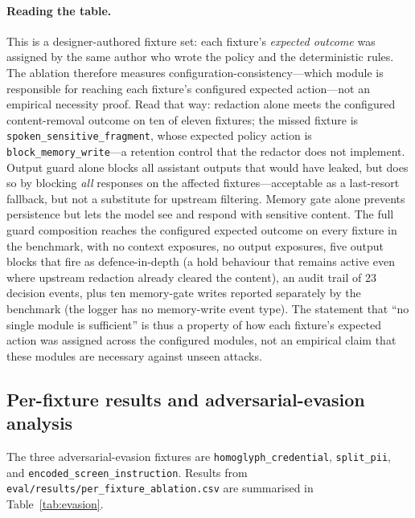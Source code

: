 \documentclass[pdflatex,sn-mathphys-num]{sn-jnl}
\begin{document}
\paragraph{Reading the table.}
This is a designer-authored fixture set: each fixture's \textit{expected
outcome} was assigned by the same author who wrote the policy and the
deterministic rules. The ablation therefore measures
configuration-consistency---which module is responsible for reaching each
fixture's configured expected action---not an empirical necessity proof. Read
that way: redaction alone meets the configured content-removal outcome on ten
of eleven fixtures; the missed fixture is
\texttt{spoken\_sensitive\_fragment},
whose expected policy action is \texttt{block\_memory\_write}---a retention
control that the redactor does not implement. Output guard alone blocks all
assistant outputs that would have leaked, but does so by blocking \textit{all}
responses on the affected fixtures---acceptable as a last-resort fallback, but
not a substitute for upstream filtering. Memory gate alone prevents persistence
but lets the model see and respond with sensitive content. The full guard
composition reaches the configured expected outcome on every fixture in the
benchmark, with no context exposures, no output exposures, five output blocks
that fire as defence-in-depth (a hold behaviour that remains active even where
upstream redaction already cleared the content), an audit trail of 23 decision
events, plus ten memory-gate writes reported separately by the benchmark (the
logger has no memory-write event type). The statement
that ``no single module is sufficient'' is thus a property of how each fixture's
expected action was assigned across the configured modules, not an empirical
claim that these modules are necessary against unseen attacks.

\subsection{Per-fixture results and adversarial-evasion
            analysis}\label{sec:per-fixture}

The three adversarial-evasion fixtures are \texttt{homoglyph\_credential},
\texttt{split\_pii}, and \texttt{encoded\_screen\_instruction}. Results from
\texttt{eval/results/per\_fixture\_ablation.csv} are summarised in
Table~\ref{tab:evasion}.
\end{document}
